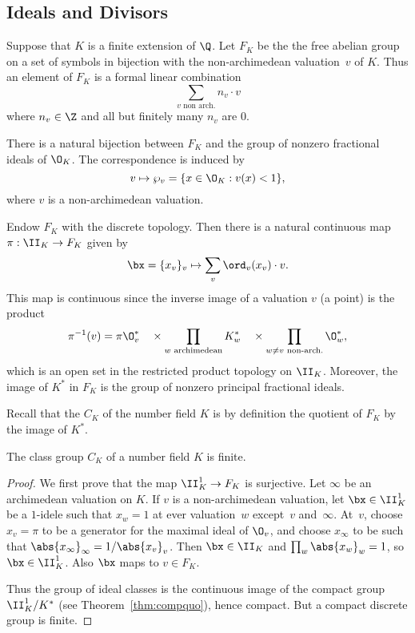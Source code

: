 \documentclass[11pt]{book}
\begin{document}
\begin{ch}
\section{Ideals and Divisors}
Suppose that $K$ is a finite extension of $\Q$.  Let $F_K$ be the the
free abelian group on a set of symbols in bijection with the
non-archimedean valuation~$v$ of $K$.  Thus an element of $F_K$
is a formal linear combination
$$
  \sum_{v\text{ non arch.}} n_v \cdot v
$$
where $n_v\in\Z$ and all but finitely many $n_v$ are $0$.

\begin{lemma}
  There is a natural bijection between $F_K$ and the group of nonzero
  fractional ideals of $\O_K$.  The correspondence is induced by
  $$ v\mapsto \wp_v = \{x \in \O_K : v(x)<1\},$$
where $v$ is a non-archimedean valuation.
\end{lemma}


Endow $F_K$ with the discrete topology.  Then there is a natural
continuous map $\pi:\II_K \to F_K$ given by
$$
\bx = \{x_v\}_v \mapsto \sum_v \ord_v(x_v)\cdot v.
$$
This map is continuous since the inverse image of
a valuation $v$ (a point) is the product
$$
\pi^{-1}(v) = \pi \O_v^* \quad \times
\prod_{w \text{ archimedean}} K_w^*\quad
\times \prod_{w\neq v \text{ non-arch.}} \O_w^*,
$$
which is an open set in the restricted product
topology on $\II_K$.
Moreover, the image of $K^*$ in $F_K$ is the group of nonzero
principal fractional ideals.

Recall that the  $C_K$ of the number field $K$
is by definition the quotient of $F_K$ by the image of $K^*$.

\begin{theorem}\label{thm:classgrpfin}
The class group $C_K$ of a number field $K$ is finite.
\end{theorem}
\begin{proof}
  We first prove that the map $\II_K^1\to F_K$ is surjective.  Let
  $\infty$ be an archimedean valuation on $K$.  If $v$ is a
  non-archimedean valuation, let $\bx\in \II_K^1$ be a $1$-idele such
  that $x_w=1$ at ever valuation~$w$ except~$v$ and~$\infty$.  At~$v$,
  choose $x_v = \pi$ to be a generator for the maximal ideal of
  $\O_v$, and choose $x_\infty$ to be such that $\abs{x_\infty}_\infty
  = 1/\abs{x_v}_v$.  Then $\bx\in \II_K$ and $\prod_{w}\abs{x_w}_w =
  1$, so $\bx\in\II_K^1$.  Also $\bx$ maps to $v \in F_K$.

  Thus the group of ideal classes is the continuous image of the
  compact group $\II_K^1/K^*$ (see Theorem~\ref{thm:compquo}), hence
  compact.  But a compact discrete group is finite.
\end{proof}


\end{ch}
\end{document}
